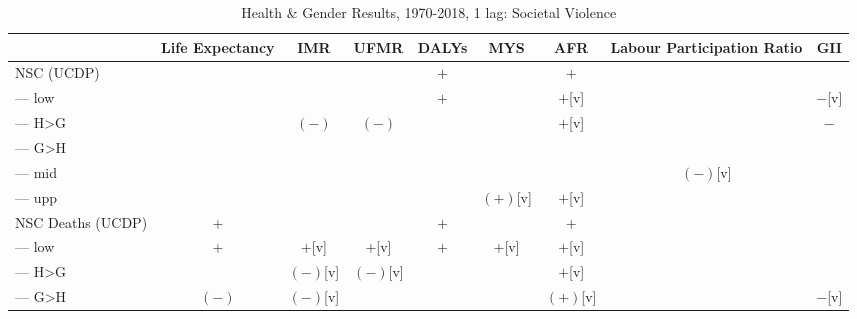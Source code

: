\documentclass[12pt]{article}
\begin{document}
\begin{table}
\small
\centering
\caption{Health \& Gender Results, 1970-2018, 1 lag: Societal Violence}
\label{table_summary}
\begin{tabular}{lcccccccc}
\toprule
                          & Life Expectancy     & IMR                 & UFMR         & DALYs           & MYS      & AFR                           & Labour Participation Ratio     & GII \\
\midrule
NSC (UCDP)                &                     &                     &              & $+$             &          & $+$                           &                                & \\
--- low                   &                     &                     &              & $+$             &          & $+$[v]                        &                                & $-$[v] \\
--- H>G                   &                     & $(-)$               & $(-)$        &                 &          & $+$[v]                        &                                & $-$ \\
--- G>H                   &                     &                     &              &                 &          &                               &                                & \\
--- mid                   &                     &                     &              &                 &          &                               & $(-)$[v]                       & \\
--- upp                   &                     &                     &              &                 & $(+)$[v] & $+$[v]                        &                                & \\
NSC Deaths (UCDP)         & $+$                 &                     &              & $+$             &          & $+$                           &                                & \\
--- low                   & $+$                 & $+$[v]              & $+$[v]       & $+$             & $+$[v]   & $+$[v]                        &                                & \\
--- H>G                   &                     & $(-)$[v]            & $(-)$[v]     &                 &          & $+$[v]                        &                                & \\
--- G>H                   & $(-)$               & $(-)$[v]            &              &                 &          & $(+)$[v]                      &                                & $-$[v] \\

\end{tabular}
\end{table}
\end{document}
